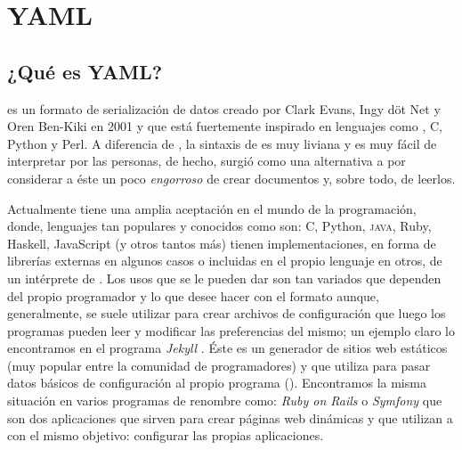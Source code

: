 \chapter{YAML}
\label{appendix:yaml}


\section{¿Qué es YAML?}

\yaml{} es un formato de serialización de datos creado por Clark Evans, Ingy döt Net y Oren Ben-Kiki en 2001 y que está fuertemente inspirado en lenguajes como \xml{}, C, Python y Perl. A diferencia de \xml{}, la sintaxis de \yaml{} es muy liviana y es muy fácil de interpretar por las personas, de hecho, surgió como una alternativa a \xml{} por considerar a éste un poco \textit{engorroso} de crear documentos y, sobre todo, de leerlos.

Actualmente tiene una amplia aceptación en el mundo de la programación, donde, lenguajes tan populares y conocidos como son: C, Python, \textsc{java}, Ruby, Haskell, JavaScript (y otros tantos más) tienen implementaciones, en forma de librerías externas en algunos casos o incluidas en el propio lenguaje en otros, de un intérprete de \yaml{}. Los usos que se le pueden dar son tan variados que dependen del propio programador y lo que desee hacer con el formato aunque, generalmente, se suele utilizar para crear archivos de configuración que luego los programas pueden leer y modificar las preferencias del mismo; un ejemplo claro lo encontramos en el programa \textit{Jekyll} \cite{web:jekyll}. Éste es un generador de sitios web estáticos (muy popular entre la comunidad de programadores) y que utiliza \yaml{} para pasar datos básicos de configuración al propio programa ().
Encontramos la misma situación en varios programas de renombre como: \textit{Ruby on Rails} \cite{web:ruby-on-rails} o \textit{Symfony} \cite{web:symfony} que son dos aplicaciones que sirven para crear páginas web dinámicas y que utilizan a \yaml{} con el mismo objetivo: configurar las propias aplicaciones.

